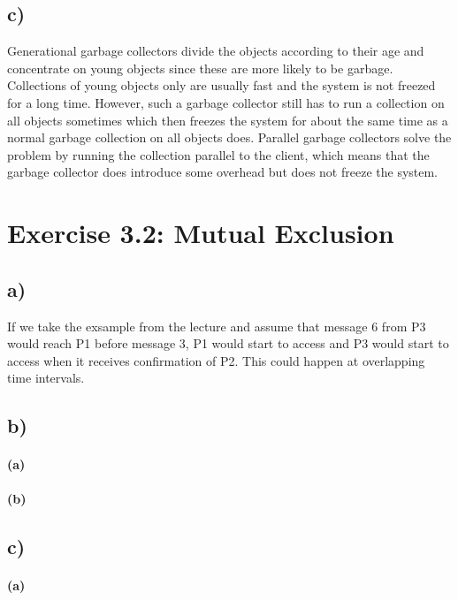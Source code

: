 \documentclass[12pt,a4paper]{article}
\begin{document}
\subsection*{c)} Generational garbage collectors divide the objects according to their age and concentrate on young objects since these are more likely to be garbage. Collections of young objects only are usually fast and the system is not freezed for a long time. However, such a garbage collector still has to run a collection on all objects sometimes which then freezes the system for about the same time as a normal garbage collection on all objects does.
Parallel garbage collectors solve the problem by running the collection parallel to the client, which means that the garbage collector does introduce some overhead but does not freeze the system.

\section*{Exercise 3.2: Mutual Exclusion}
  \subsection*{a)} 
  If we take the exsample from the lecture and assume that message 6 from P3 would reach P1 before message 3, P1 would start to access and P3 would start to access when it receives confirmation of P2. This could happen at overlapping time intervals.
  \subsection*{b)} %
    \paragraph*{(a)} %
    \paragraph*{(b)} %
  \subsection*{c)} %
    \paragraph*{(a)} %
\end{document}
